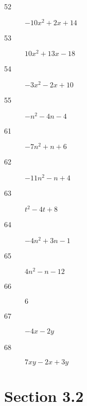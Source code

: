 \documentclass[letterpaper]{exam}
\begin{document}
\begin{description}
          \item[52] $-10x^2 + 2x + 14$

          \item[53] $10x^2 + 13x - 18$ 

          \item[54] $-3x^2 - 2x + 10$

          \item[55] $-n^2 -4n -4$

          \item[61] $-7n^2 + n + 6$

          \item[62] $-11n^2 - n + 4$

          \item[63] $t^2 - 4t + 8$

          \item[64] $-4n^2 + 3n - 1$

          \item[65] $4n^2 - n - 12$

          \item[66] $6$

          \item[67] $-4x - 2y$

          \item[68] $7xy - 2x + 3y$

      \end{description}

      \section{Section 3.2}
\end{document}
